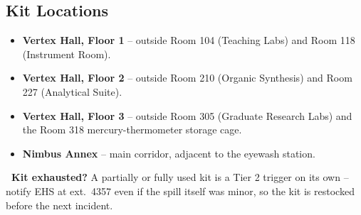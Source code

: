 \subsection*{Kit Locations}
\begin{itemize}
  \item \textbf{Vertex Hall, Floor 1} -- outside Room 104 (Teaching Labs) and Room 118 (Instrument
        Room).
  \item \textbf{Vertex Hall, Floor 2} -- outside Room 210 (Organic Synthesis) and Room 227
        (Analytical Suite).
  \item \textbf{Vertex Hall, Floor 3} -- outside Room 305 (Graduate Research Labs) and the
        Room 318 mercury-thermometer storage cage.
  \item \textbf{Nimbus Annex} -- main corridor, adjacent to the eyewash station.
\end{itemize}

\begin{notebox}
\textbf{\hazicon{\faInfoCircle}\ Kit exhausted?} A partially or fully used kit is a Tier 2 trigger
on its own -- notify EHS at ext.\ 4357 even if the spill itself was minor, so the kit is
restocked before the next incident.
\end{notebox}
